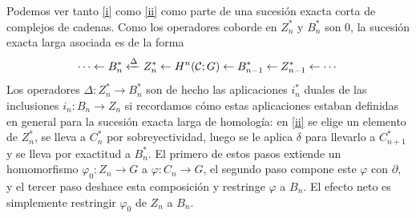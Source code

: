\documentclass[TA.tex]{subfiles}
\begin{document}
Podemos ver tanto \ref{i} como \ref{ii} como parte de una sucesión exacta corta de complejos de cadenas. Como los operadores coborde en $Z_n^*$ y $B_n^*$ son 0, la sucesión exacta larga asociada es de la forma
\begin{equation}\label{iii}
\cdots\leftarrow B_n^*\xleftarrow{\Delta} Z_n^*\leftarrow H^n(\mathcal{C};G)\leftarrow B_{n-1}^*\leftarrow Z_{n-1}^*\leftarrow\cdots
\end{equation}
Los operadores $\Delta:Z_n^*\to B_n^*$ son de hecho las aplicaciones $i_n^*$ duales de las inclusiones $i_n:B_n\to Z_n$ si recordamos cómo estas aplicaciones estaban definidas en general para la sucesión exacta larga de homología: en \ref{ii} se elige un elemento de $Z_n^*$, se lleva a $C_n^*$ por sobreyectividad, luego se le aplica $\delta$ para llevarlo a $C_{n+1}^*$ y se lleva por exactitud a $B_n^*$. El primero de estos pasos extiende un homomorfismo $\varphi_0:Z_n\to G$ a $\varphi:C_n\to G$, el segundo paso compone este $\varphi$ con $\partial$, y el tercer paso deshace esta composición y restringe $\varphi$ a $B_n$. El efecto neto es simplemente restringir $\varphi_0$ de $Z_n$ a $B_n$.
\end{document}
